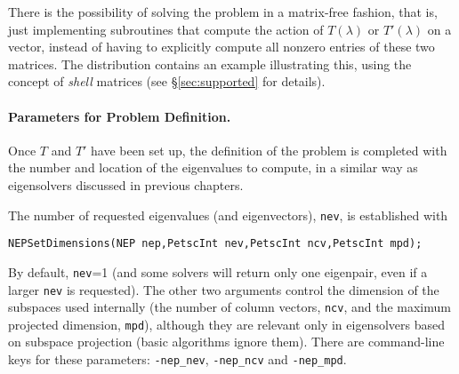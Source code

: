 There is the possibility of solving the problem in a matrix-free fashion, that is, just implementing subroutines that compute the action of $T(\lambda)$ or $T'(\lambda)$ on a vector, instead of having to explicitly compute all nonzero entries of these two matrices. The \slepc distribution contains an example illustrating this, using the concept of \emph{shell} matrices (see \S\ref{sec:supported} for details).

\paragraph{Parameters for Problem Definition.}

Once $T$ and $T'$ have been set up, the definition of the problem is completed with the number and location of the eigenvalues to compute, in a similar way as eigensolvers discussed in previous chapters.

	The number of requested eigenvalues (and eigenvectors), \texttt{nev}, is established with
	\begin{Verbatim}[fontsize=\small]
	NEPSetDimensions(NEP nep,PetscInt nev,PetscInt ncv,PetscInt mpd);
	\end{Verbatim}
By default, \texttt{nev}=1 (and some solvers will return only one eigenpair, even if a larger \texttt{nev} is requested). The other two arguments control the dimension of the subspaces used internally (the number of column vectors, \texttt{ncv}, and the maximum projected dimension, \texttt{mpd}), although they are relevant only in eigensolvers based on subspace projection (basic algorithms ignore them). There are command-line keys for these parameters: \Verb!-nep_nev!, \Verb!-nep_ncv! and \Verb!-nep_mpd!.

